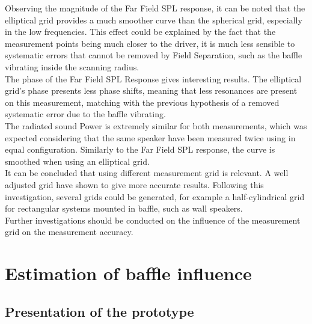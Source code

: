 \documentclass{report}
\begin{document}
Observing the magnitude of the Far Field SPL response, it can be noted that the elliptical grid provides a much smoother curve than the spherical grid, especially in the low frequencies. This effect could be explained by the fact that the measurement points being much closer to the driver, it is much less sensible to systematic errors that cannot be removed by Field Separation, such as the baffle vibrating inside the scanning radius. \\

The phase of the Far Field SPL Response gives interesting results. The elliptical grid's phase presents less phase shifts, meaning that less resonances are present on this measurement, matching with the previous hypothesis of a removed systematic error due to the baffle vibrating. \\

The radiated sound Power is extremely similar for both measurements, which was expected considering that the same speaker have been measured twice using in equal configuration. Similarly to the Far Field SPL response, the curve is smoothed when using an elliptical grid. \\

It can be concluded that using different measurement grid is relevant. A well adjusted grid have shown to give more accurate results. Following this investigation, several grids could be generated, for example a half-cylindrical grid for rectangular systems mounted in baffle, such as wall speakers.\\
Further investigations should be conducted on the influence of the measurement grid on the measurement accuracy.


\section{Estimation of baffle influence}

\subsection{Presentation of the prototype}
\end{document}
